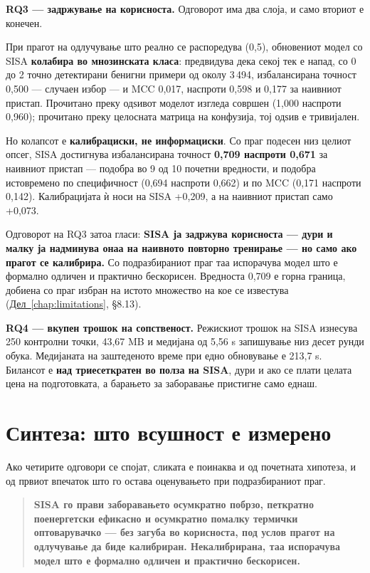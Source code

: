 \textbf{RQ3 --- задржување на корисноста.} Одговорот има два слоја, и само вториот е конечен.

При прагот на одлучување што реално се распоредува (0,5), обновениот модел со SISA
\textbf{колабира во мнозинската класа}: предвидува дека секој тек е напад, со 0 до 2 точно
детектирани бенигни примери од околу 3\,494, избалансирана точност 0,500 --- случаен избор --- и
MCC 0,017, наспроти 0,598 и 0,177 за наивниот пристап. Прочитано преку одѕивот моделот
изгледа совршен (1,000 наспроти 0,960); прочитано преку целосната матрица на конфузија, тој
одѕив е тривијален.

Но колапсот е \textbf{калибрациски, не информациски}. Со праг подесен низ целиот опсег, SISA
достигнува избалансирана точност \textbf{0,709 наспроти 0,671} за наивниот пристап --- подобра во 9
од 10 почетни вредности, и подобра истовремено по специфичност (0,694 наспроти 0,662) и по
MCC (0,171 наспроти 0,142). Калибрацијата ѝ носи на SISA +0,209, а на наивниот пристап само
+0,073.

Одговорот на RQ3 затоа гласи: \textbf{SISA ја задржува корисноста --- дури и малку ја надминува
онаа на наивното повторно тренирање --- но само ако прагот се калибрира.} Со подразбираниот
праг таа испорачува модел што е формално одличен и практично бескорисен. Вредноста 0,709 е
горна граница, добиена со праг избран на истото множество на кое се известува
(\hyperref[chap:limitations]{Дел~\ref*{chap:limitations}}, §8.13).

\textbf{RQ4 --- вкупен трошок на сопственост.} Режискиот трошок на SISA изнесува 250 контролни
точки, 43,67 MB и медијана од 5,56 s запишување низ десет рунди обука. Медијаната на
заштеденото време при едно обновување е 213,7 s. Билансот е \textbf{над триесеткратен во полза на
SISA}, дури и ако се плати целата цена на подготовката, а барањето за заборавање пристигне
само еднаш.

\section{Синтеза: што всушност е измерено}

Ако четирите одговори се спојат, сликата е поинаква и од почетната хипотеза, и од првиот
впечаток што го остава оценувањето при подразбираниот праг.

\begin{quote}
\textbf{SISA го прави заборавањето осумкратно побрзо, петкратно поенергетски ефикасно и
осумкратно помалку термички оптоварувачко --- без загуба во корисноста, под услов прагот на
одлучување да биде калибриран. Некалибрирана, таа испорачува модел што е формално одличен
и практично бескорисен.}
\end{quote}

